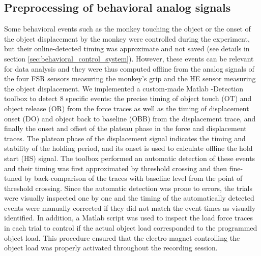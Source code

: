 \subsection{Preprocessing of behavioral analog signals}

Some behavioral events such as the monkey touching the object or the onset of the object displacement by the monkey were controlled during the experiment, but their online-detected timing was approximate and not saved (see details in section \cref{sec:behavioral_control_system}). However, these events can be relevant for data analysis and they were thus computed offline from the analog signals of the four FSR sensors measuring the monkey's grip and the HE sensor measuring the object displacement. We implemented a custom-made Matlab -Detection toolbox to detect 8 specific events: the precise timing of object touch (OT) and object release (OR) from the force traces as well as the timing of displacement onset (DO) and object back to baseline (OBB) from the displacement trace, and finally the onset and offset of the plateau phase in the force and displacement traces. The plateau phase of the displacement signal indicates the timing and stability of the holding period, and its onset is used to calculate offline the hold start (HS) signal. The toolbox performed an automatic detection of these events and their timing was first approximated by threshold crossing and then fine-tuned by back-comparison of the traces with baseline level from the point of threshold crossing. Since the automatic detection was prone to errors, the trials were visually inspected one by one and the timing of the automatically detected events were manually corrected if they did not match the event times as visually identified. In addition, a Matlab script was used to inspect the load force traces in each trial to control if the actual object load corresponded to the programmed object load. This procedure ensured that the electro-magnet controlling the object load was properly activated throughout the recording session. 


